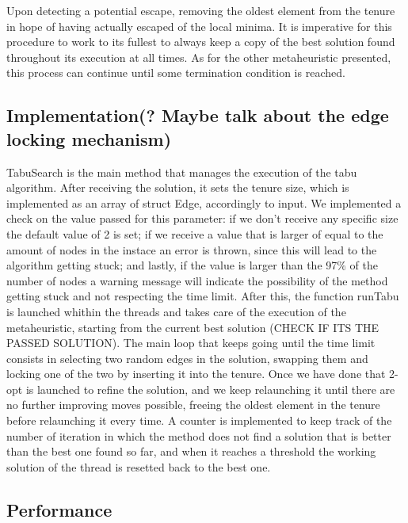 Upon detecting a potential escape, removing the oldest element from the tenure in hope of having actually escaped of the local minima.
It is imperative for this procedure to work to its fullest to always keep a copy of the best solution found throughout its execution at all times.
As for the other metaheuristic presented, this process can continue until some termination condition is reached.

\subsection{Implementation(? Maybe talk about the edge locking mechanism)}
TabuSearch is the main method that manages the execution of the tabu algorithm.
After receiving the solution, it sets the tenure size, which is implemented as an array of struct Edge, accordingly to input.
We implemented a check on the value passed for this parameter: if we don't receive any specific size the default value of 2 is set; if we receive a value that is larger of equal to the amount of nodes in 
the instace an error is thrown, since this will lead to the algorithm getting stuck; and lastly, if the value is larger than the 97\% of the 
number of nodes a warning message will indicate the possibility of the method getting stuck and not respecting the time limit.
After this, the function runTabu is launched whithin the threads and takes care of the execution of the metaheuristic, starting from the current best solution (CHECK IF ITS THE PASSED SOLUTION).
The main loop that keeps going until the time limit consists in selecting two random edges in the solution, swapping them and locking one of the two by inserting it into the tenure.
Once we have done that 2-opt is launched to refine the solution, and we keep relaunching it until there are no further improving moves possible, freeing the oldest element in the tenure before relaunching it every time.
A counter is implemented to keep track of the number of iteration in which the method does not find a solution 
that is better than the best one found so far, and when it reaches a threshold the working solution of the thread is resetted back to the best one.

\subsection{Performance}


